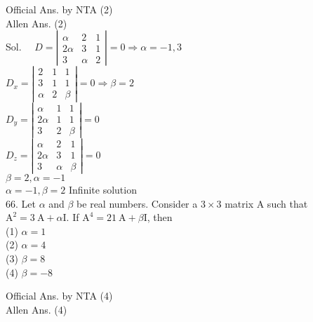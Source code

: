 \documentclass[10pt]{article}
\begin{document}
Official Ans. by NTA (2)\\
Allen Ans. (2)\\
Sol. \(\quad D=\left|\begin{array}{ccc}\alpha & 2 & 1 \\ 2 \alpha & 3 & 1 \\ 3 & \alpha & 2\end{array}\right|=0 \Rightarrow \alpha=-1,3\)\\
\(D_{x}=\left|\begin{array}{lll}2 & 1 & 1 \\ 3 & 1 & 1 \\ \alpha & 2 & \beta\end{array}\right|=0 \Rightarrow \beta=2\)\\
\(D_{y}=\left|\begin{array}{ccc}\alpha & 1 & 1 \\ 2 \alpha & 1 & 1 \\ 3 & 2 & \beta\end{array}\right|=0\)\\
\(D_{z}=\left|\begin{array}{ccc}\alpha & 2 & 1 \\ 2 \alpha & 3 & 1 \\ 3 & \alpha & \beta\end{array}\right|=0\)\\
\(\beta=2, \alpha=-1\)\\
\(\alpha=-1, \beta=2\) Infinite solution\\
66. Let \(\alpha\) and \(\beta\) be real numbers. Consider a \(3 \times 3\) matrix A such that \(\mathrm{A}^{2}=3 \mathrm{~A}+\alpha \mathrm{I}\). If \(\mathrm{A}^{4}=21 \mathrm{~A}+\beta \mathrm{I}\), then\\
(1) \(\alpha=1\)\\
(2) \(\alpha=4\)\\
(3) \(\beta=8\)\\
(4) \(\beta=-8\)

Official Ans. by NTA (4)\\
Allen Ans. (4)
\end{document}
